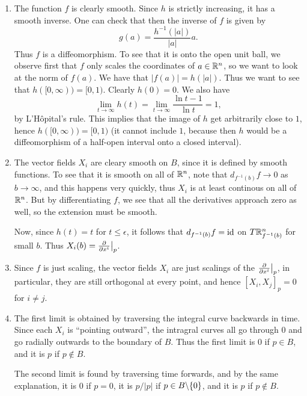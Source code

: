 \documentclass[11pt, english]{article}
\begin{document}
\begin{sol}
  \begin{enumerate}
  \item The function $f$ is clearly smooth. Since $h$ is strictly increasing, it has a smooth inverse. One can check that then the inverse of $f$ is given by
$$
g(a) = \frac{h^{-1}(\lvert a \rvert)}{\lvert a \rvert} a.
$$
Thus $f$ is a diffeomorphism. To see that it is onto the open unit ball, we observe first that $f$ only scales the coordinates of $a \in \mathbb{R}^n$, so we want to look at the norm of $f(a)$. We have that $\rvert f(a) \lvert = h(\lvert a \rvert)$. Thus we want to see that $h([0,\infty))= [0,1)$. Clearly $h(0)=0$. We also have 
\[
\lim_{t \to \infty} h(t) = \lim_{t \to \infty} \frac{\ln t -1}{\ln t} = 1,
\]
by L'Hôpital's rule. This implies that the image of $h$ get arbitrarily close to $1$, hence $h([0,\infty))=[0,1)$ (it cannot include $1$, because then $h$ would be a diffeomorphism of a half-open interval onto a closed interval).

\item The vector fields $X_i$ are cleary smooth on $B$, since it is defined by smooth functions. To see that it is smooth on all of $\mathbb{R}^n$, note that $d_{f^{-1}(b)}f \to 0$ as $b \to \infty$, and this happens very quickly, thus $X_i$ is at least continous on all of $\mathbb{R}^n$. But by differentiating $f$, we see that all the derivatives approach zero as well, so the extension must be smooth.

Now, since $h(t)=t$ for $t \leq \epsilon$, it follows that $d_{f^{-1}(b)}f = \text{id}$ on $T\mathbb{R}^n_{f^{-1}(b)}$ for small $b$. Thus $X_i(b)=\restr{\dd{}{x^i}}{p}$.

\item Since $f$ is just scaling, the vector fields $X_i$ are just scalings of the $\restr{\dd{}{x^i}}{p}$, in particular, they are still orthogonal at every point, and hence $[X_i,X_j]_p=0$ for $i \neq j$. 

\item The first limit is obtained by traversing the integral curve backwards in time. Since each $X_i$ is ``pointing outward'', the intragral curves all go through $0$ and go radially outwards to the boundary of $B$. Thus the first limit is $0$ if $p \in B$, and it is $p$ if $p \not \in B$. 

The second limit is found by traversing time forwards, and by the same explanation, it is $0$ if $p=0$, it is $p/\lvert p \rvert$ if $ p\in B\backslash \{0 \}$, and it is $p$ if $ p \not \in B$.


\end{enumerate}
\end{sol}
\end{document}
